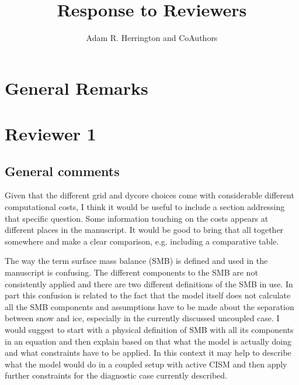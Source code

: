 \documentclass[12pt,oneside,a4paper]{article}%
\title{\large Response to Reviewers}
\author{\normalsize Adam R. Herrington and CoAuthors}
\date{} %
\begin{document}
\maketitle

\section*{General Remarks}

{\color{red}{We would like to thank both reviewers for taking the time to provide thoughtful feedback on our manuscript.}} \newline

\section*{Reviewer 1}

\subsection*{General comments}

Given that the different grid and dycore choices come with considerable different computational costs, I think it would be useful to include a section addressing that specific question. Some information touching on the costs appears at different places in the manuscript. It would be good to bring that all together somewhere and make a clear comparison, e.g. including a comparative table. \newline

{\color{blue}{We have added a subsection on computational costs to address the reviewers concern, in the methods section.}} \newline

The way the term surface mass balance (SMB) is defined and used in the manuscript is confusing. The different components to the SMB are not consistently applied and there are two different definitions of the SMB in use. In part this confusion is related to the fact that the model itself does not calculate all the SMB components and assumptions have to be made about the separation between snow and ice, especially in the currently discussed uncoupled case. I would suggest to start with a physical definition of SMB with all its components in an equation and then explain based on that what the model is actually doing and what constraints have to be applied. In this context it may help to describe what the model would do in a coupled setup with active CISM and then apply further constraints for the diagnostic case currently described. \newline
\end{document}
